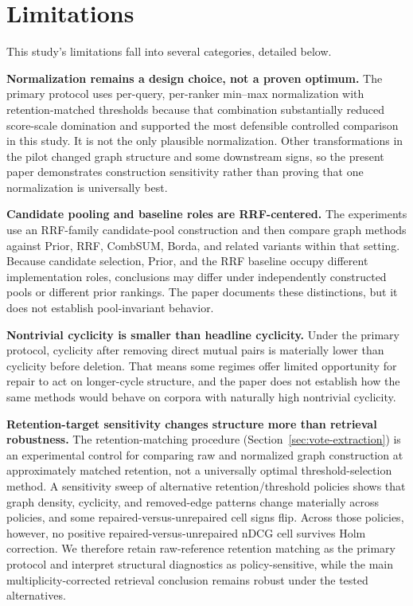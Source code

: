 \documentclass[manuscript,anonymous,review]{acmart}
\begin{document}
\section{Limitations}
\label{sec:threats}

This study's limitations fall into several categories, detailed below.

\textbf{Normalization remains a design choice, not a proven optimum.} The
primary protocol uses per-query, per-ranker min--max normalization with
retention-matched thresholds because that combination substantially reduced
score-scale domination and supported the most defensible controlled comparison
in this study. It is not the only plausible normalization. Other
transformations in the pilot changed graph structure and some downstream signs,
so the present paper demonstrates construction sensitivity rather than proving
that one normalization is universally best.

\textbf{Candidate pooling and baseline roles are RRF-centered.} The experiments
use an RRF-family candidate-pool construction and then compare graph methods
against Prior, RRF, CombSUM, Borda, and related variants within that setting.
Because candidate selection, Prior, and the RRF baseline occupy different
implementation roles, conclusions may differ under independently constructed
pools or different prior rankings. The paper documents these distinctions, but
it does not establish pool-invariant behavior.

\textbf{Nontrivial cyclicity is smaller than headline cyclicity.} Under the
primary protocol, cyclicity after removing direct mutual pairs is materially
lower than cyclicity before deletion. That means some regimes offer limited
opportunity for repair to act on longer-cycle structure, and the paper does not
establish how the same methods would behave on corpora with naturally high
nontrivial cyclicity.

\textbf{Retention-target sensitivity changes structure more than retrieval
robustness.} The retention-matching procedure (Section~\ref{sec:vote-extraction})
is an experimental control for comparing raw and normalized graph construction
at approximately matched retention, not a universally optimal threshold-selection
method. A sensitivity sweep of alternative retention/threshold policies shows that
graph density, cyclicity, and removed-edge patterns change materially across
policies, and some repaired-versus-unrepaired cell signs flip. Across those
policies, however, no positive repaired-versus-unrepaired nDCG cell survives Holm
correction. We therefore retain raw-reference retention matching as the primary
protocol and interpret structural diagnostics as policy-sensitive, while the main
multiplicity-corrected retrieval conclusion remains robust under the tested
alternatives.
\end{document}
